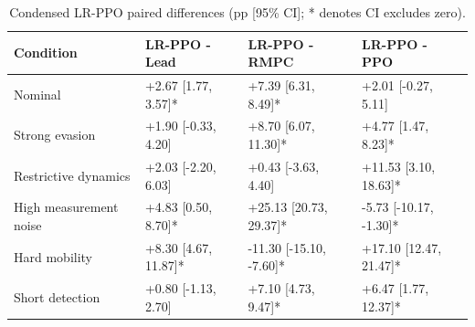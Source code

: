 \begin{table}[t]
\centering
\caption{Condensed LR-PPO paired differences (pp [95\% CI]; * denotes CI excludes zero).}
\label{tab:robustness_condensed}
\begin{tabular}{llll}
\hline
Condition & LR-PPO - Lead & LR-PPO - RMPC & LR-PPO - PPO \\
\hline
Nominal & +2.67 [1.77, 3.57]* & +7.39 [6.31, 8.49]* & +2.01 [-0.27, 5.11] \\
Strong evasion & +1.90 [-0.33, 4.20] & +8.70 [6.07, 11.30]* & +4.77 [1.47, 8.23]* \\
Restrictive dynamics & +2.03 [-2.20, 6.03] & +0.43 [-3.63, 4.40] & +11.53 [3.10, 18.63]* \\
High measurement noise & +4.83 [0.50, 8.70]* & +25.13 [20.73, 29.37]* & -5.73 [-10.17, -1.30]* \\
Hard mobility & +8.30 [4.67, 11.87]* & -11.30 [-15.10, -7.60]* & +17.10 [12.47, 21.47]* \\
Short detection & +0.80 [-1.13, 2.70] & +7.10 [4.73, 9.47]* & +6.47 [1.77, 12.37]* \\
\hline
\end{tabular}
\end{table}
